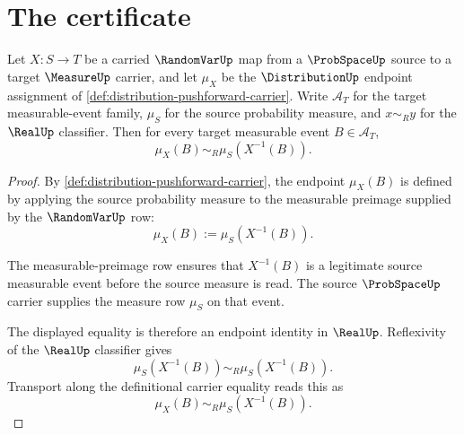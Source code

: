 \section{The certificate}
\label{sec:distribution-certificate}

\begin{theorem}
\label{thm:distribution-pushforward-row}
Let $X:S\to T$ be a carried $\RandomVarUp$ map from a $\ProbSpaceUp$ source to a target $\MeasureUp$ carrier, and let $\mu_X$ be the $\DistributionUp$ endpoint assignment of \autoref{def:distribution-pushforward-carrier}. Write $\mathcal{A}_T$ for the target measurable-event family, $\mu_S$ for the source probability measure, and $x\sim_R y$ for the $\RealUp$ classifier. Then for every target measurable event $B\in\mathcal{A}_T$,
$$
\mu_X(B)\sim_R\mu_S(X^{-1}(B)).
$$
\end{theorem}
\begin{proof}
By \autoref{def:distribution-pushforward-carrier}, the endpoint $\mu_X(B)$ is defined by applying the source probability measure to the measurable preimage supplied by the $\RandomVarUp$ row:
$$
\mu_X(B):=\mu_S(X^{-1}(B)).
$$

The measurable-preimage row ensures that $X^{-1}(B)$ is a legitimate source measurable event before the source measure is read. The source $\ProbSpaceUp$ carrier supplies the measure row $\mu_S$ on that event.

The displayed equality is therefore an endpoint identity in $\RealUp$. Reflexivity of the $\RealUp$ classifier gives
$$
\mu_S(X^{-1}(B))\sim_R\mu_S(X^{-1}(B)).
$$
Transport along the definitional carrier equality reads this as
$$
\mu_X(B)\sim_R\mu_S(X^{-1}(B)).
$$
\end{proof}

